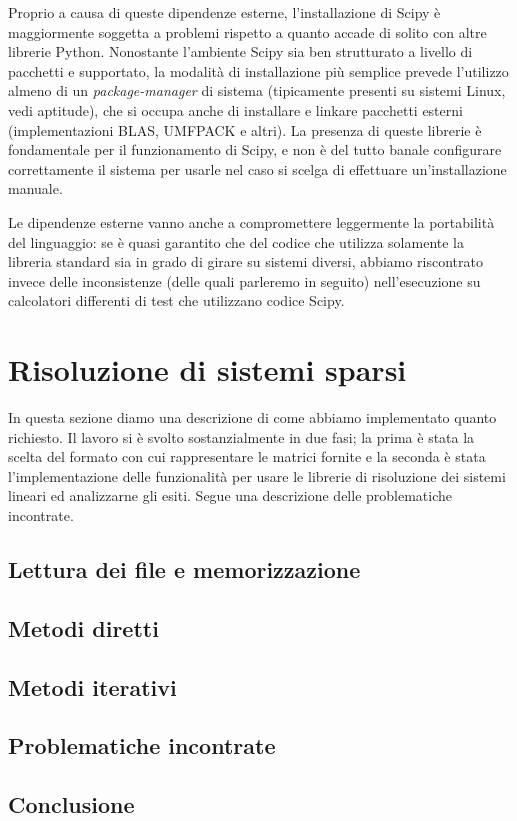 \documentclass[11pt,a4paper]{scrartcl}
\begin{document}
Proprio a causa di queste dipendenze esterne, l'installazione di Scipy è maggiormente soggetta a problemi rispetto a quanto accade di solito con altre librerie Python. Nonostante l'ambiente Scipy sia ben strutturato a livello di pacchetti e supportato, la modalità di installazione più semplice prevede l'utilizzo almeno di un \emph{package-manager} di sistema (tipicamente presenti su sistemi Linux, vedi aptitude), che si occupa anche di installare e linkare pacchetti esterni (implementazioni BLAS, UMFPACK e altri). La presenza di queste librerie è fondamentale per il funzionamento di Scipy, e non è del tutto banale configurare correttamente il sistema per usarle nel caso si scelga di effettuare un'installazione manuale.

Le dipendenze esterne vanno anche a compromettere leggermente la portabilità del linguaggio: se è quasi garantito che del codice che utilizza solamente la libreria standard sia in grado di girare su sistemi diversi, abbiamo riscontrato invece delle inconsistenze (delle quali parleremo in seguito) nell'esecuzione su calcolatori differenti di test che utilizzano codice Scipy. 


\section*{Risoluzione di sistemi sparsi}

In questa sezione diamo una descrizione di come abbiamo implementato quanto richiesto. Il lavoro si è svolto sostanzialmente in due fasi; la prima è stata la scelta del formato con cui rappresentare le matrici fornite e la seconda è stata l'implementazione delle funzionalità per usare le librerie di risoluzione dei sistemi lineari ed analizzarne gli esiti. Segue una descrizione delle problematiche incontrate.

\subsection*{Lettura dei file e memorizzazione}

\subsection*{Metodi diretti}

\subsection*{Metodi iterativi}

\subsection*{Problematiche incontrate}

\subsection*{Conclusione}
\end{document}
